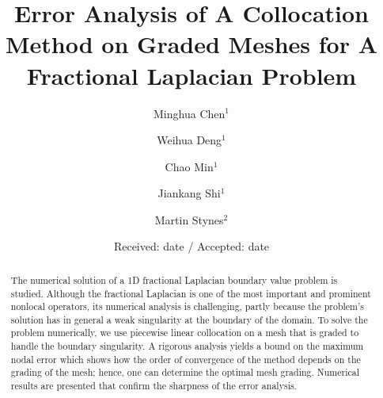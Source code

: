 \documentclass[smallextended]{svjour3}       %
\begin{document}
\title{Error Analysis of A Collocation Method on Graded Meshes for A Fractional Laplacian Problem%
}

\author{Minghua Chen$^1$\and Weihua Deng$^1$\and Chao Min$^1$\and Jiankang Shi$^1$\and
        Martin Stynes$^2$ %
}


\date{Received: date / Accepted: date}

\maketitle

\begin{abstract}
The numerical solution of a 1D fractional Laplacian boundary value problem is studied. Although the fractional Laplacian is one of the most important and  prominent nonlocal operators, its numerical analysis is challenging, partly because the problem's solution has in general a weak singularity at the boundary of the domain.  To solve the problem numerically, we use piecewise linear collocation on a mesh that is graded to handle the boundary singularity.  A rigorous analysis yields a bound on the maximum nodal error which shows how the order of convergence of the method depends on the grading of the mesh; hence, one can determine the optimal mesh grading.
Numerical results are presented that confirm the sharpness of the error analysis.
\end{abstract}
\end{document}
